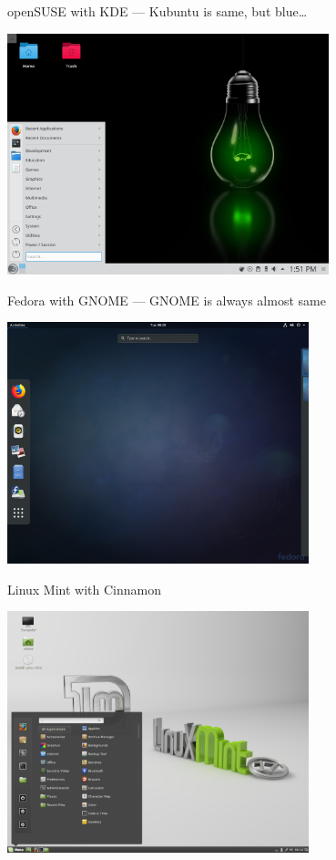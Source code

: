 \documentclass[compress, ucs, xelatex, 11pt, xcolor=svgnames,
  hyperref={
    bookmarks=true,
    unicode=true,
    colorlinks=true,
    pdftitle={Linux, command line and MetaCentrum},
    plainpages=false,
    pdfauthor={Vojtech Zeisek},
    pdfsubject={Course about use of Linux command line, writing shell scripts and using MetaCentrum of CESNET},
    pdfcreator={XeLaTeX},
    pdfkeywords={Linux, GNU, BASH, shell, command line, MetaCentrum},
    linkcolor=DarkRed,
    anchorcolor=DarkBlue,
    citecolor=Indigo,
    filecolor=NavyBlue,
    menucolor=DarkMagenta,
    urlcolor=DarkBlue,
    pdftex},
  url={hyphens, lowtilde} %
  ]{beamer}
\begin{document}
\begin{frame}{openSUSE with KDE --- Kubuntu is same, but blue\ldots} %
  \begin{center}
    \includegraphics[height=7cm]{opensuse.png}
  \end{center}
\end{frame}

\begin{frame}{Fedora with GNOME --- GNOME is always almost same} %
  \begin{center}
    \includegraphics[height=7cm]{fedora.png}
  \end{center}
\end{frame}

\begin{frame}{Linux Mint with Cinnamon} %
  \begin{center}
    \includegraphics[height=7cm]{mint.png}
  \end{center}
\end{frame}
\end{document}
